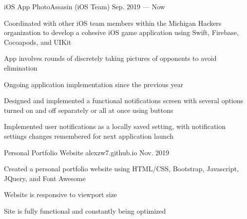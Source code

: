 

\begin{cventries}

  \cventry
    {iOS App}
    {PhotoAssasin (iOS Team)}
    {Sep. 2019 — Now}
    {}
    {
      \begin{cvitems} %
        \item {Coordinated with other iOS team members within the Michigan Hackers organization to develop a cohesive iOS game application
        using Swift, Firebase, Cocoapods, and UIKit}
        \item {App involves rounds of discretely taking pictures of opponents to avoid elimination}
        \item {Ongoing application implementation since the previous year}
        \item {Designed and implemented a functional notifications screen with several options turned on and off separately or all at once using buttons}
        \item {Implemented user notifications as a locally saved setting, with notification settings changes remembered for next application launch}
      \end{cvitems}
    }

  \cventry
    {Personal Portfolio Website}
    {alexzw7.github.io}
    {Nov. 2019}
    {}
    {
      \begin{cvitems} %
        \item {Created a personal portfolio website using HTML/CSS, Bootstrap, Javascript, JQuery, and Font Awesome}
        \item {Website is responsive to viewport size}
        \item {Site is fully functional and constantly being optimized}
      \end{cvitems}
    }


\end{cventries}
